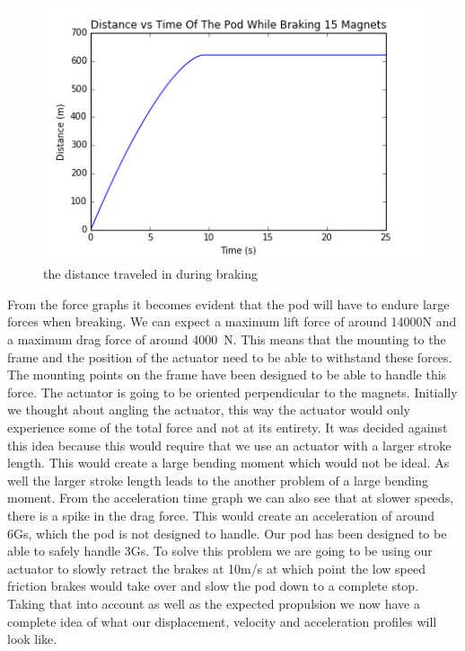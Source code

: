 \documentclass[main.tex]{subfiles}
\begin{document}
    \begin{figure}
        \centering
        \includegraphics[width=\linewidth]{images/distance_time_graph}
        \caption{the distance traveled in during braking}
        \label{fig:distance-profile}
    \end{figure}
    
    From the force graphs it becomes evident that the pod will have to endure large forces when breaking. We can expect a maximum lift force of around 14000N and a maximum drag force of around \SI{4000}{N}. This means that the mounting to the frame and the position of the actuator need to be able to withstand these forces. The mounting points on the frame have been designed to be able to handle this force. The actuator is going to be oriented perpendicular to the magnets. Initially we thought about angling the actuator, this way the actuator would only experience some of the total force and not at its entirety. It was decided against this idea because this would require that we use an actuator with a larger stroke length. This would create a large bending moment which would not be ideal. As well the larger stroke length leads to the another problem of a large bending moment.
    From the acceleration time graph we can also see that at slower speeds, there is a spike in the drag force. This would create an acceleration of around 6Gs, which the pod is not designed to handle. Our pod has been designed to be able to safely handle 3Gs. To solve this problem we are going to be using our actuator to slowly retract the brakes at 10m/s at which point the low speed friction brakes would take over and slow the pod down to a complete stop. 
   Taking that into account as well as the expected propulsion we now have a complete idea of what our displacement, velocity and acceleration profiles will look like.
   
\end{document}
